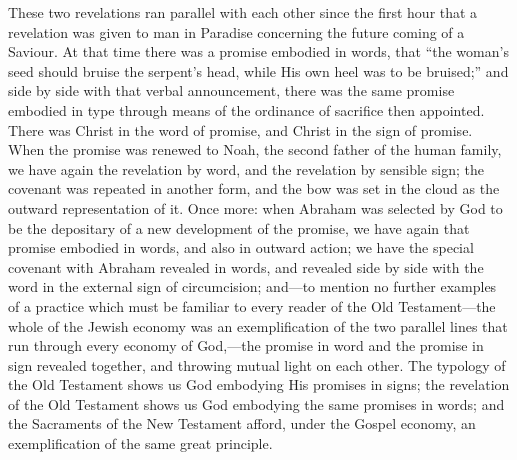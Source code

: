 \documentclass[]{book}
\begin{document}
These two revelations ran parallel with each other since the first hour that a revelation was given to man in Paradise concerning the future coming of a Saviour. At that time there was a promise embodied in words, that ``the woman's seed should bruise the serpent's head, while His own heel was to be bruised;'' and side by side with that verbal announcement, there was the same promise embodied in type through means of the ordinance of sacrifice then appointed. There was Christ in the word of promise, and Christ in the sign of promise. When the promise was renewed to Noah, the second father of the human family, we have again the revelation by word, and the revelation by sensible sign; the covenant was repeated in another form, and the bow was set in the cloud as the outward representation of it. Once more: when Abraham was selected by God to be the depositary of a new development of the promise, we have again that promise embodied in words, and also in outward action; we have the special covenant with Abraham revealed in words, and revealed side by side with the word in the external sign of circumcision; and---to mention no further examples of a practice which must be familiar to every reader of the Old Testament---the whole of the Jewish economy was an exemplification of the two parallel lines that run through every economy of God,---the promise in word and the promise in sign revealed together, and throwing mutual light on each other. The typology of the Old Testament shows us God embodying His promises in signs; the revelation of the Old Testament shows us God embodying the same promises in words; and the Sacraments of the New Testament afford, under the Gospel economy, an exemplification of the same great principle.
\end{document}
